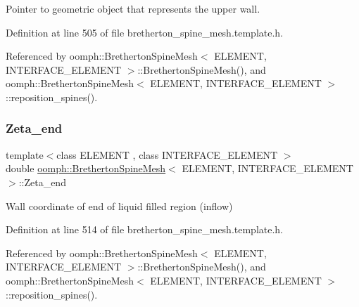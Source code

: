 Pointer to geometric object that represents the upper wall. 



Definition at line 505 of file bretherton\+\_\+spine\+\_\+mesh.\+template.\+h.



Referenced by oomph\+::\+Bretherton\+Spine\+Mesh$<$ E\+L\+E\+M\+E\+N\+T, I\+N\+T\+E\+R\+F\+A\+C\+E\+\_\+\+E\+L\+E\+M\+E\+N\+T $>$\+::\+Bretherton\+Spine\+Mesh(), and oomph\+::\+Bretherton\+Spine\+Mesh$<$ E\+L\+E\+M\+E\+N\+T, I\+N\+T\+E\+R\+F\+A\+C\+E\+\_\+\+E\+L\+E\+M\+E\+N\+T $>$\+::reposition\+\_\+spines().

\mbox{\label{classoomph_1_1BrethertonSpineMesh_ac1b5e005bfb5db65f54ca599942126ea}} 
\subsubsection{\texorpdfstring{Zeta\+\_\+end}{Zeta\_end}}
{\footnotesize\ttfamily template$<$class E\+L\+E\+M\+E\+NT , class I\+N\+T\+E\+R\+F\+A\+C\+E\+\_\+\+E\+L\+E\+M\+E\+NT $>$ \\
double \hyperlink{classoomph_1_1BrethertonSpineMesh}{oomph\+::\+Bretherton\+Spine\+Mesh}$<$ E\+L\+E\+M\+E\+NT, I\+N\+T\+E\+R\+F\+A\+C\+E\+\_\+\+E\+L\+E\+M\+E\+NT $>$\+::Zeta\+\_\+end\hspace{0.3cm}{\ttfamily [protected]}}



Wall coordinate of end of liquid filled region (inflow) 



Definition at line 514 of file bretherton\+\_\+spine\+\_\+mesh.\+template.\+h.



Referenced by oomph\+::\+Bretherton\+Spine\+Mesh$<$ E\+L\+E\+M\+E\+N\+T, I\+N\+T\+E\+R\+F\+A\+C\+E\+\_\+\+E\+L\+E\+M\+E\+N\+T $>$\+::\+Bretherton\+Spine\+Mesh(), and oomph\+::\+Bretherton\+Spine\+Mesh$<$ E\+L\+E\+M\+E\+N\+T, I\+N\+T\+E\+R\+F\+A\+C\+E\+\_\+\+E\+L\+E\+M\+E\+N\+T $>$\+::reposition\+\_\+spines().

\mbox{\label{classoomph_1_1BrethertonSpineMesh_a0f41083aa9a97fca03d498bd6ec21eb2}} 
